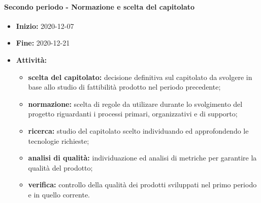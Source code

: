 \paragraph[Secondo periodo]{Secondo periodo - \textnormal{Normazione e scelta del capitolato}}
\begin{itemize}
    \item [] \textbf{Inizio:} 2020-12-07
    \item [] \textbf{Fine:} 2020-12-21
    \item [] \textbf{Attività:}
          \begin{itemize}
              \item \textbf{scelta del capitolato:} decisione definitiva sul capitolato da svolgere in base allo studio di fattibilità prodotto nel periodo precedente;
              \item \textbf{normazione:} scelta di regole da utilizare durante lo svolgimento del progetto riguardanti i processi primari, organizzativi e di supporto;
              \item \textbf{ricerca:} studio del capitolato scelto individuando ed approfondendo le tecnologie richieste;
              \item \textbf{analisi di qualità:} individuazione ed analisi di metriche per garantire la qualità del prodotto;
              \item \textbf{verifica:} controllo della qualità dei prodotti sviluppati nel primo periodo e in quello corrente.
          \end{itemize}
\end{itemize}

